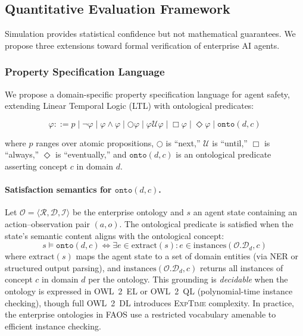 \documentclass[11pt,a4paper]{article}
\newcommand{\faos}{\textsc{FAOS}}
\newcommand{\onto}{\mathcal{O}}
\newcommand{\prop}{\varphi}
\begin{document}
\subsection{Quantitative Evaluation Framework}
\label{sec:formal-extensions}

Simulation provides statistical confidence but not mathematical
guarantees. We propose three extensions toward formal verification
of enterprise AI agents.

\subsubsection{Property Specification Language}

We propose a domain-specific property specification language for
agent safety, extending Linear Temporal Logic (LTL)
\citep{pnueli1977temporal} with ontological predicates:

\begin{equation}
  \prop ::= p \mid \neg\prop \mid \prop \wedge \prop \mid
    \bigcirc\prop \mid \prop \mathcal{U} \prop \mid
    \Box\prop \mid \Diamond\prop \mid
    \texttt{onto}(d, c)
\end{equation}

\noindent where $p$ ranges over atomic propositions, $\bigcirc$ is
``next,'' $\mathcal{U}$ is ``until,'' $\Box$ is ``always,''
$\Diamond$ is ``eventually,'' and $\texttt{onto}(d, c)$ is an
ontological predicate asserting concept $c$ in domain $d$.

\paragraph{Satisfaction semantics for $\texttt{onto}(d, c)$.}
Let $\onto = \langle \mathcal{R}, \mathcal{D}, \mathcal{I} \rangle$
be the enterprise ontology and $s$ an agent state containing an
action--observation pair $(a, o)$. The ontological predicate is
satisfied when the state's semantic content aligns with the
ontological concept:
\begin{equation}
  s \models \texttt{onto}(d, c) \iff
    \exists e \in \text{extract}(s) : e \in
    \text{instances}(\onto.\mathcal{D}_d, c)
\end{equation}
\noindent where $\text{extract}(s)$ maps the agent state to a set
of domain entities (via NER or structured output parsing), and
$\text{instances}(\onto.\mathcal{D}_d, c)$ returns all instances
of concept $c$ in domain $d$ per the ontology. This grounding is
\emph{decidable} when the ontology is expressed in OWL~2~EL or
OWL~2~QL (polynomial-time instance checking), though full OWL~2~DL
introduces \textsc{ExpTime} complexity. In practice, the enterprise
ontologies in \faos{} use a restricted vocabulary amenable to
efficient instance checking.
\end{document}
